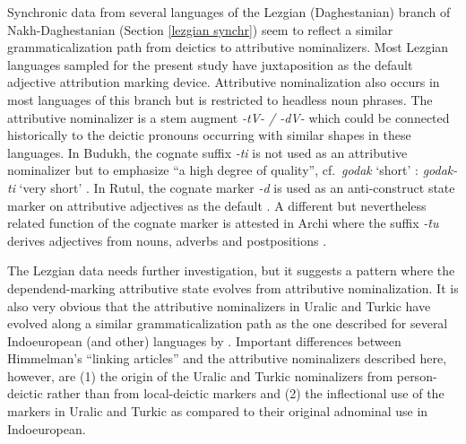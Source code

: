 {Synchronic data from several languages of the Lezgian (Daghestanian) branch of Nakh-Daghestanian (Section \ref{lezgian synchr}) seem to reflect a similar grammaticalization path from deictics to attributive nominalizers. Most Lezgian languages sampled for the present study have juxtaposition as the default adjective attribution marking device. Attributive nominalization also occurs in most languages of this branch but is restricted to headless noun phrases. The attributive nominalizer is a stem augment \textit{-tV- / -dV-} which could be connected historically to the deictic pronouns occurring with similar shapes in these languages. In Budukh, the cognate suffix \textit{-ti} is not used as an attributive nominalizer but to emphasize “a high degree of quality”, cf.~\textit{godak} ‘short’ : \textit{godak-ti} ‘very short’ \citep[267]{alekseev1994b}. In Rutul, the cognate marker \textit{-d} is used as an anti-construct state marker on attributive adjectives as the default \citep[224]{alekseev1994a}. A different but nevertheless related function of the cognate marker is attested in Archi where the suffix \textit{-t̄u} derives adjectives from nouns, adverbs and postpositions \citep[318]{kibrik1994b}.

The Lezgian data needs further investigation, but it suggests a pattern where the dependend-marking attributive state evolves from attributive nominalization. It is also very obvious that the attributive nominalizers in Uralic and Turkic have evolved along a similar grammaticalization path as the one described for several Indoeuropean (and other) languages by \cite{himmelmann1997}. Important differences between Himmelman's “linking articles” and the attributive nominalizers described here, however, are (1) the origin of the Uralic and Turkic nominalizers from person-deictic rather than from local-deictic markers and (2) the inflectional use of the markers in Uralic and Turkic as compared to their original adnominal use in Indoeuropean.

}
